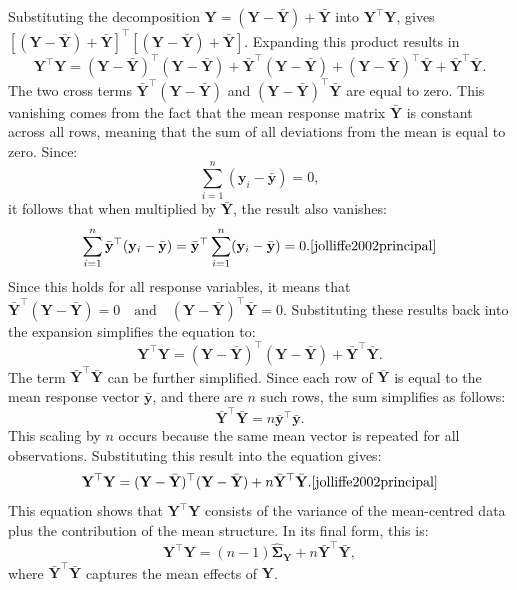 \documentclass[11pt]{report} %
\begin{document}
Substituting the decomposition \( \mathbf{Y} = (\mathbf{Y} - \bar{\mathbf{Y}}) + \bar{\mathbf{Y}} \) into \( \mathbf{Y}^\top \mathbf{Y} \), gives $
   [(\mathbf{Y} - \bar{\mathbf{Y}}) + \bar{\mathbf{Y}}]^\top [(\mathbf{Y} - \bar{\mathbf{Y}}) + \bar{\mathbf{Y}}].$
Expanding this product results in
   \[
   \mathbf{Y}^\top \mathbf{Y} = (\mathbf{Y} - \bar{\mathbf{Y}})^\top (\mathbf{Y} - \bar{\mathbf{Y}}) + \bar{\mathbf{Y}}^\top (\mathbf{Y} - \bar{\mathbf{Y}}) + (\mathbf{Y} - \bar{\mathbf{Y}})^\top \bar{\mathbf{Y}} + \bar{\mathbf{Y}}^\top \bar{\mathbf{Y}}.
   \]
The two cross terms \( \bar{\mathbf{Y}}^\top (\mathbf{Y} - \bar{\mathbf{Y}}) \) and \( (\mathbf{Y} - \bar{\mathbf{Y}})^\top \bar{\mathbf{Y}} \) are equal to zero. This vanishing comes from the fact that the mean response matrix \( \bar{\mathbf{Y}} \) is constant across all rows, meaning that the sum of all deviations from the mean is equal to zero. Since:
   \[
   \sum_{i=1}^{n} (\mathbf{y}_i - \bar{\mathbf{y}}) = 0,
   \]
it follows that when multiplied by \( \bar{\mathbf{Y}} \), the result also vanishes:
\[
\sum_{i=1}^{n} \bar{\mathbf{y}}^\top (\mathbf{y}_i - \bar{\mathbf{y}}) = \bar{\mathbf{y}}^\top \sum_{i=1}^{n} (\mathbf{y}_i - \bar{\mathbf{y}}) = 0.\cite{jolliffe2002principal}
\]
Since this holds for all response variables, it means that $
   \bar{\mathbf{Y}}^\top (\mathbf{Y} - \bar{\mathbf{Y}}) = 0 \quad \text{and} \quad (\mathbf{Y} - \bar{\mathbf{Y}})^\top \bar{\mathbf{Y}} = 0.$
Substituting these results back into the expansion simplifies the equation to:
   \[
   \mathbf{Y}^\top \mathbf{Y} = (\mathbf{Y} - \bar{\mathbf{Y}})^\top (\mathbf{Y} - \bar{\mathbf{Y}}) + \bar{\mathbf{Y}}^\top \bar{\mathbf{Y}}.
   \]
The term \( \bar{\mathbf{Y}}^\top \bar{\mathbf{Y}} \) can be further simplified. Since each row of \( \bar{\mathbf{Y}} \) is equal to the mean response vector \( \bar{\mathbf{y}} \), and there are \( n \) such rows, the sum simplifies as follows:
\[
   \bar{\mathbf{Y}}^\top \bar{\mathbf{Y}} = n \bar{\mathbf{y}}^\top \bar{\mathbf{y}}.
\]
This scaling by \( n \) occurs because the same mean vector is repeated for all observations. Substituting this result into the equation gives:
\[
   \mathbf{Y}^\top \mathbf{Y} = (\mathbf{Y} - \bar{\mathbf{Y}})^\top (\mathbf{Y} - \bar{\mathbf{Y}}) + n \bar{\mathbf{Y}}^\top \bar{\mathbf{Y}}.\cite{jolliffe2002principal}
\]
This equation shows that \( \mathbf{Y}^\top \mathbf{Y} \) consists of the variance of the mean-centred data plus the contribution of the mean structure. In its final form, this is:
\[
\mathbf{Y}^\top\mathbf{Y} = (n-1)\mathbf{\hat{\Sigma}_Y}+n\mathbf{\bar{Y}}^\top\mathbf{\bar{Y}},
\]
where $\mathbf{\bar{Y}}^\top\mathbf{\bar{Y}}$ captures the mean effects of $\mathbf{Y}$. 
\end{document}
